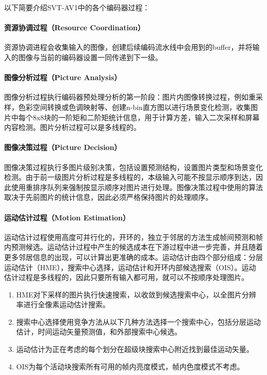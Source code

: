   以下简要介绍SVT-AV1中的各个编码器过程：
  \paragraph{资源协调过程（Resource Coordination）} 资源协调进程会收集输入的图像，创建后续编码流水线中会用到的buffer，并将输入的图像与当前的编码器设置一同传递到下一级。

  \paragraph{图像分析过程（Picture Analysis）} 图像分析过程执行编码器预处理分析的第一阶段：图片内图像转换过程，例如重采样，色彩空间转换或色调映射等、创建n-bin直方图以进行场景变化检测，收集图片中每个8x8块的一阶矩和二阶矩统计信息，用于计算方差，输入二次采样和屏幕内容检测。图片分析过程可以是多线程的。

  \paragraph{图像决策过程（Picture Decision）} 图像决策过程执行多图片级别决策，包括设置预测结构，设置图片类型和场景变化检测。由于前一级图片分析过程是多线程的，本级输入可能不按显示顺序到达，因此使用重排序队列来强制按显示顺序对图片进行处理。图像决策过程中使用的算法取决于先前图片的统计信息，因此必须严格保持图片的处理顺序。

  \paragraph{运动估计过程（Motion Estimation）} 运动估计过程使用高度可并行化的，开环的，独立于邻居的方法生成帧间预测和帧内预测候选。运动估计过程中产生的候选成本在下游过程中进一步完善，并且随着更多邻居信息的出现，可以计算出更准确的成本。运动估计由四个部分组成：分层运动估计（HME），搜索中心选择，运动估计和开环内部候选搜索（OIS）。运动估计过程是多线程的，因此只要所有输入都可用，就可以不按顺序处理图片。
  \begin{enumerate} [label=\arabic*)]
    \item HME对下采样的图片执行快速搜索，以收敛到候选搜索中心，以全图片分辨率进行全像素运动估计搜索。
    \item 搜索中心选择使用竞争方法从以下几种方法选择一个搜索中心，包括分层运动估计，时间运动矢量预测值，和外部搜索中心候选。
    \item 运动估计为正在考虑的每个划分在超级块搜索中心附近找到最佳运动矢量。
    \item OIS为每个活动块搜索所有可用的帧内亮度模式，帧内色度模式不考虑。
  \end{enumerate}

